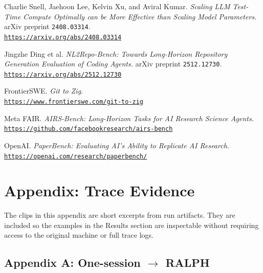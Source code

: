\documentclass[11pt,a4paper]{article}
\begin{document}
\begin{enumerate}[leftmargin=2.0em,label={[\arabic*]}]
  \item Charlie Snell, Jaehoon Lee, Kelvin Xu, and Aviral Kumar. \emph{Scaling LLM Test-Time Compute Optimally can be More Effective than Scaling Model Parameters.} arXiv preprint \texttt{2408.03314}.\\
    \href{https://arxiv.org/abs/2408.03314}{\nolinkurl{https://arxiv.org/abs/2408.03314}}

  \item Jingzhe Ding et al. \emph{NL2Repo-Bench: Towards Long-Horizon Repository Generation Evaluation of Coding Agents.} arXiv preprint \texttt{2512.12730}.\\
    \href{https://arxiv.org/abs/2512.12730}{\nolinkurl{https://arxiv.org/abs/2512.12730}}

  \item FrontierSWE. \emph{Git to Zig.}\\
    \href{https://www.frontierswe.com/git-to-zig}{\nolinkurl{https://www.frontierswe.com/git-to-zig}}

  \item Meta FAIR. \emph{AIRS-Bench: Long-Horizon Tasks for AI Research Science Agents.}\\
    \href{https://github.com/facebookresearch/airs-bench}{\nolinkurl{https://github.com/facebookresearch/airs-bench}}

  \item OpenAI. \emph{PaperBench: Evaluating AI's Ability to Replicate AI Research.}\\
    \href{https://openai.com/research/paperbench/}{\nolinkurl{https://openai.com/research/paperbench/}}
\end{enumerate}
\endgroup

\clearpage
\section{Appendix: Trace Evidence}

The clips in this appendix are short excerpts from run artifacts. They are included so the examples in the Results section are inspectable without requiring access to the original machine or full trace logs.

\subsection{Appendix A: One-session $\rightarrow$ RALPH}
\end{document}
